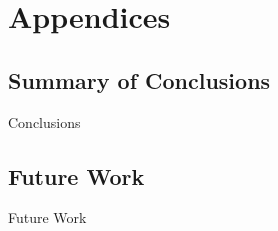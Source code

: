 \glsresetall %
\chapter{Appendices}\label{ch:Appendices}

\section{Summary of Conclusions}
Conclusions

\section{Future Work}\label{sec:FutureWork}
Future Work
